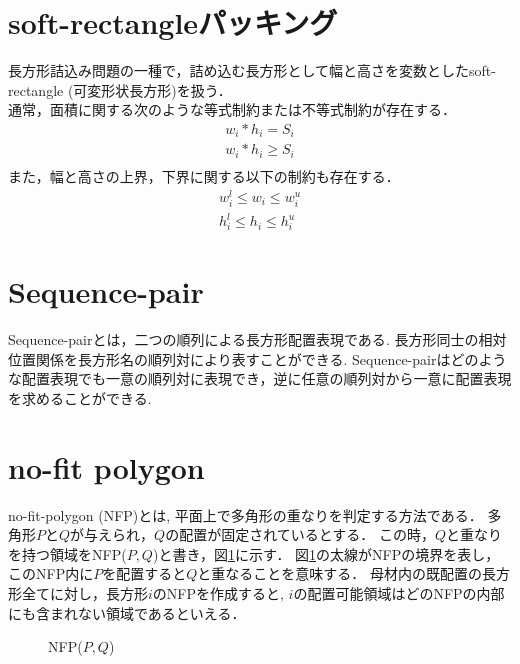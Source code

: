 \section{soft-rectangleパッキング}
長方形詰込み問題の一種で，詰め込む長方形として幅と高さを変数としたsoft-rectangle (可変形状長方形)を扱う\cite{soft-rectangle}．\\
通常，面積に関する次のような等式制約または不等式制約が存在する．\\
\begin{eqnarray}
    w_i * h_i = S_i \\
    w_i * h_i \geq S_i \\
\end{eqnarray}
また，幅と高さの上界，下界に関する以下の制約も存在する．
\begin{eqnarray}
    w_i^l \leq w_i \leq w_i^u \\
    h_i^l \leq h_i \leq h_i^u
\end{eqnarray}

\section{Sequence-pair}
Sequence-pairとは，二つの順列による長方形配置表現である\cite{seq-pair}. 
長方形同士の相対位置関係を長方形名の順列対により表すことができる. 
Sequence-pairはどのような配置表現でも一意の順列対に表現でき，逆に任意の順列対から一意に配置表現を求めることができる. 


\section{no-fit polygon}
no-fit-polygon (NFP)とは, 平面上で多角形の重なりを判定する方法である\cite{nfp}\cite{nfp2}．
多角形$P$と$Q$が与えられ，$Q$の配置が固定されているとする．
この時，$Q$と重なりを持つ領域をNFP($P,Q$)と書き，図\ref{figure31}に示す．
図\ref{figure31}の太線がNFPの境界を表し，このNFP内に$P$を配置すると$Q$と重なることを意味する．
母材内の既配置の長方形全てに対し，長方形$i$のNFPを作成すると, $i$の配置可能領域はどのNFPの内部にも含まれない領域であるといえる．

\begin{figure}
    \label{figure31}
    \caption{NFP($P,Q$)}
\end{figure}